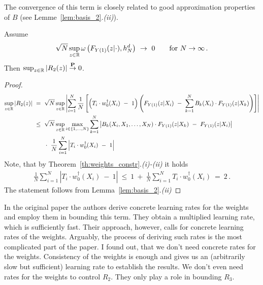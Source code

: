 The convergence of this term is closely related to good approximation properties of $B$ (see Lemme~\ref{lem:basis_2}.\textit{(ii)}). 
\begin{lemma}
\label{aa:mean:l:r2}
  Assume
  \begin{align*}
    \sqrt{N}
    \sup_{z\in\R}
    \omega
    \left( 
      F_{Y(1)}(z|\cdot)
      ,h_N^d
    \right)
    \ 
    \to 
    \ 
    0
    \qquad
    \text{for}\ 
    N\to\infty
    \,.
  \end{align*}
  Then $\sup_{z\in\mathbb{R}}|R_2(z)|\overset{\mathbf{P}}{\to} 0$.
\end{lemma}
\begin{proof}
  \begin{align*}
    \sup_{z\in\R}
    \left| R_2(z) \right|
    &
    \
    =
    \
  \sqrt{N}
  \sup_{z\in\R}
  \left|
    \sum_{i=1}^{N} 
    \frac{1}{N}
    \left[ 
      \left( 
    T_i\cdot w_0^\dagger(X_i) 
    \ 
    -
    \ 
    1 
      \right)
    \left( 
  F_{Y(1)}(z|X_i)
    \ 
    -
    \ 
    \sum_{k=1}^{N} 
    B_k(X_i)
    \cdot
  F_{Y(1)}(z|X_k)
    \right)
    \right]
  \right|
\\
    &
    \  
    \le
    \  
        \sqrt{N}
        \sup_{z\in\R}
        \max_{i\in \left\{ 1,\ldots,N \right\}}
        \sum_{k=1}^{N}
            \left|
        B_k(X_i,X_1,\ldots,X_N)
        \cdot
        F_{Y(1)}(z|X_k)
            \ 
            -
            \ 
        F_{Y(1)}(z|X_i)
            \right|
            \\
            &
            \qquad
            \cdot
            \ 
    \frac{1}{N}
    \sum_{i=1}^{N} 
      \left| 
    T_i\cdot w^\dagger_0(X_i) 
    \ 
    -
    \ 
    1 
      \right|
  \end{align*}
  Note, that by Theorem~\ref{th:weights_constr}.\textit{(i)-(ii)}
  it holds
  \begin{align*}
    \frac{1}{N}
    \sum_{i=1}^{N} 
      \left| 
    T_i\cdot w^\dagger_0(X_i) 
    \ 
    -
    \ 
    1 
      \right|
      \ 
    \le
      \ 
    1
    \ 
    +
    \ 
    \frac{1}{N}
    \sum_{i=1}^{N} 
    T_i\cdot w^\dagger_0(X_i) 
    \ 
    =
    \ 
    2
    \,.
  \end{align*}
  The statement follows from Lemma~\ref{lem:basis_2}.\textit{(ii)}
\end{proof}
\begin{remark}
In the original paper \cite{Wang2019} the authors derive concrete learning rates for the weights and employ them in bounding this term. They obtain a multiplied learning rate, which is sufficiently fast. Their approach, however, calls for concrete learning rates of the weights. Arguably, the process of deriving such rates is the most complicated part of the paper. 
I found out, that we don't need concrete rates for the weights. 
Consistency of the weights is enough and gives us an (arbitrarily slow but sufficient) learning rate to establish the results.
We don't even need rates for the weights to control $R_2$.
They only play a role in bounding $R_3$. 
\end{remark}


